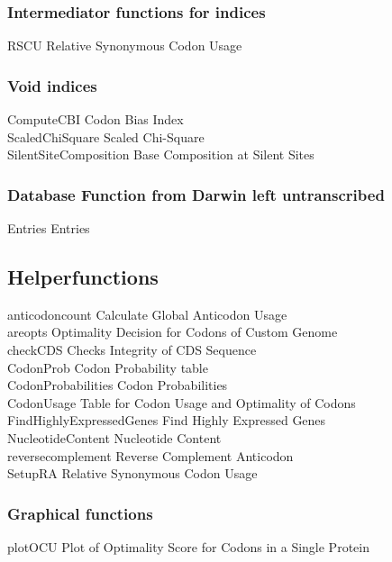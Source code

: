 \subsubsection{Intermediator functions for indices}
RSCU	Relative \quad Synonymous Codon Usage \\								%

\subsubsection{Void indices}
ComputeCBI	\quad Codon Bias Index  \\
ScaledChiSquare	\quad Scaled Chi-Square  \\
SilentSiteComposition	\quad Base Composition at Silent Sites  \\

\subsubsection{Database Function from Darwin left untranscribed}
Entries	\quad Entries \\

\subsection{Helperfunctions}
anticodoncount	\quad Calculate Global Anticodon Usage \\
areopts	\quad Optimality Decision for Codons of Custom Genome \\
checkCDS	Checks \quad Integrity of CDS Sequence \\
CodonProb	\quad Codon Probability table \\
CodonProbabilities	\quad Codon Probabilities \\
CodonUsage	\quad Table for Codon Usage and Optimality of Codons \\
FindHighlyExpressedGenes	\quad Find Highly Expressed Genes \\			%
NucleotideContent	\quad Nucleotide Content \\							%
reversecomplement	\quad Reverse Complement Anticodon \\
SetupRA	\quad Relative Synonymous Codon Usage \\

\subsubsection{Graphical functions}
plotOCU	\quad Plot of Optimality Score for Codons in a Single Protein \\


